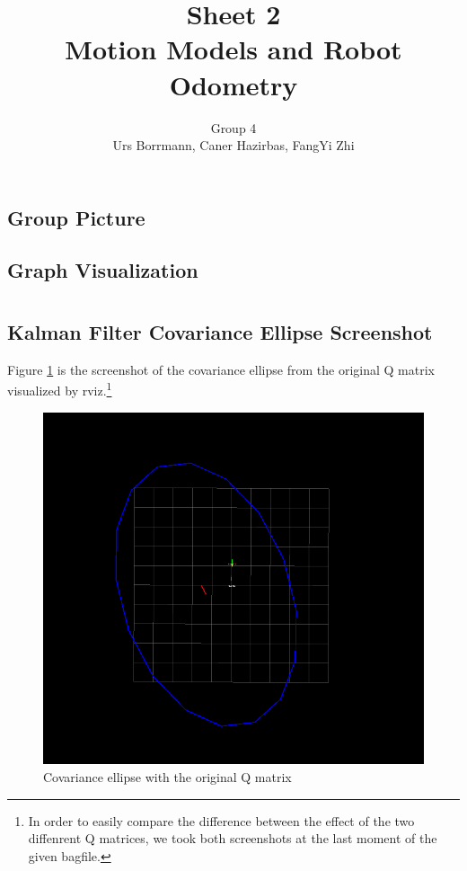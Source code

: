 \documentclass[14pt,a4paper]{article}
\title{\textbf{Sheet 2} \\  \textbf{Motion Models and Robot Odometry}}
\author{Group 4 \\Urs Borrmann, Caner Hazirbas, FangYi Zhi}
\begin{document}
\maketitle
\onehalfspacing

\section{}
	\subsection{Group Picture}


	\subsection{Graph Visualization}


\section{}
	\subsection{Kalman Filter Covariance Ellipse Screenshot}
		Figure \ref{graph:Q_origin} is the screenshot of the covariance ellipse from the original Q matrix visualized by rviz.\footnote{In order to easily compare the difference between the effect of the two diffenrent Q matrices, we took both screenshots at the last moment of the given bagfile.}\\
	
	\begin{figure}[htbp]
	\centering
	\includegraphics[scale=0.5]{Q_origin.png}
  	\caption{Covariance ellipse with the original Q matrix}
    \label{graph:Q_origin}
	\end{figure}
	
\end{document}
